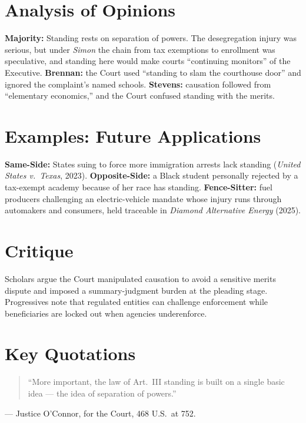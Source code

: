 \documentclass[12pt]{article}
\begin{document}
\section{Analysis of Opinions}
\textbf{Majority:} Standing rests on separation of powers. The desegregation injury was serious, but under \textit{Simon} the chain from tax exemptions to enrollment was speculative, and standing here would make courts ``continuing monitors'' of the Executive. \textbf{Brennan:} the Court used ``standing to slam the courthouse door'' and ignored the complaint's named schools. \textbf{Stevens:} causation followed from ``elementary economics,'' and the Court confused standing with the merits.

\section{Examples: Future Applications}
\textbf{Same-Side:} States suing to force more immigration arrests lack standing (\textit{United States v.\ Texas}, 2023). \textbf{Opposite-Side:} a Black student personally rejected by a tax-exempt academy because of her race has standing. \textbf{Fence-Sitter:} fuel producers challenging an electric-vehicle mandate whose injury runs through automakers and consumers, held traceable in \textit{Diamond Alternative Energy} (2025).

\section{Critique}
Scholars argue the Court manipulated causation to avoid a sensitive merits dispute and imposed a summary-judgment burden at the pleading stage. Progressives note that regulated entities can challenge enforcement while beneficiaries are locked out when agencies underenforce.

\section{Key Quotations}
\begin{quote}
``More important, the law of Art.\ III standing is built on a single basic idea --- the idea of separation of powers.''
\end{quote}
\noindent --- Justice O'Connor, for the Court, 468 U.S.\ at 752.
\end{document}
